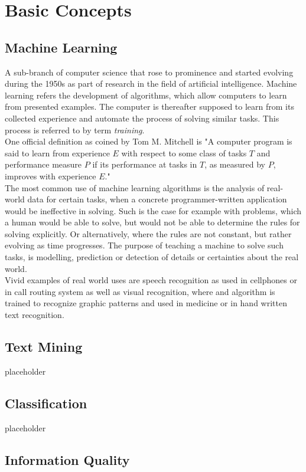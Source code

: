 \section{Basic Concepts}
	\subsection{Machine Learning}
		A sub-branch of computer science that rose to prominence and started evolving during the 1950s as part of research in the field of artificial intelligence. Machine learning refers the development of algorithms, which allow computers to learn from presented examples. The computer is thereafter supposed to learn from its collected experience and automate the process of solving similar tasks. This process is referred to by term \textit{training}.
		\\
		One official definition as coined by Tom M. Mitchell \cite{mitchell} is  "A computer program is said to learn from experience $E$ with respect to some class of tasks $ T $ and performance measure $ P $ if its performance at tasks in $ T $, as measured by $ P $, improves with experience $ E $."
		\\
		The most common use of machine learning algorithms is the analysis of real-world data for certain tasks, when a concrete programmer-written application would be ineffective in solving. Such is the case for example with problems, which a human would be able to solve, but would not be able to determine the rules for solving explicitly. Or alternatively, where the rules are not constant, but rather evolving as time progresses. The purpose of teaching a machine to solve such tasks, is modelling, prediction or detection of details or certainties about the real world. 
		\\
		Vivid examples of real world uses are speech recognition as used in cellphones or in 
		call routing system as well as visual recognition, where and algorithm is trained to recognize graphic patterns and used in medicine or in hand written text recognition.
	\subsection{Text Mining}
		{\color{red} \Large placeholder}
	\subsection{Classification}
		{\color{red} \Large placeholder}
	\subsection{Information Quality}
		
